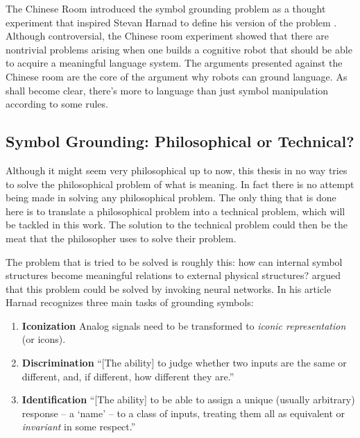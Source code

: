 \bigskip\noindent
{}
The Chinese Room introduced the symbol grounding problem as a thought experiment that inspired Stevan Harnad to define his version of the problem \cite{harnad:1990}. Although controversial, the Chinese room experiment showed that there are nontrivial problems arising when one builds a cognitive robot that should be able to acquire a meaningful language system. The arguments presented against the Chinese room are the core of the argument why robots can ground language. As shall become clear, there's more to language than just symbol manipulation according to some rules.

\subsection{Symbol Grounding: Philosophical or Technical?}

Although it might seem very philosophical up to now, this thesis in no way tries to solve the philosophical problem of what is meaning. In fact there is no attempt being made in solving any philosophical problem. The only thing that is done here is to translate a philosophical problem into a technical problem, which will be tackled in this work. The solution to the technical problem could then be the meat that the philosopher uses to solve their problem.

The problem that is tried to be solved is roughly this: how can internal symbol structures become meaningful relations to external physical structures?  argued that this problem could be solved by invoking neural networks. In his article Harnad recognizes three main tasks of grounding symbols:

\begin{enumerate}
\item {\bf Iconization} Analog signals need to be transformed to {\em iconic representation} (or icons).
\item {\bf Discrimination} ``[The ability] to judge whether two inputs are the same or different, and, if different, how different they are.''
\item {\bf Identification} ``[The ability] to be able to assign a unique (usually arbitrary) response -- a `name' -- to a class of inputs, treating them all as equivalent or {\em invariant} in some respect.'' \cite[my italics]{harnad:1990}
\end{enumerate}

